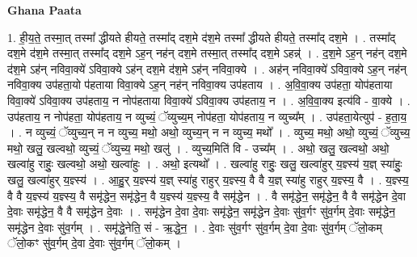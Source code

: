 \documentclass[17pt]{extarticle}
\begin{document}
\textbf{Ghana Paata } \newline

1. ही॒य॒ते॒ तस्मा॒त् तस्मा᳚ द्धीयते हीयते॒ तस्मा᳚द् दश॒मे द॑श॒मे तस्मा᳚ द्धीयते हीयते॒ तस्मा᳚द् दश॒मे । . तस्मा᳚द् दश॒मे द॑श॒मे तस्मा॒त् तस्मा᳚द् दश॒मे ऽह॒न् नह॑न् दश॒मे तस्मा॒त् तस्मा᳚द् दश॒मे ऽहन्न्॑ । . द॒श॒मे ऽह॒न् नह॑न् दश॒मे द॑श॒मे ऽह॑न् नविवा॒क्ये॑ ऽविवा॒क्ये ऽह॑न् दश॒मे द॑श॒मे ऽह॑न् नविवा॒क्ये । . अह॑न् नविवा॒क्ये॑ ऽविवा॒क्ये ऽह॒न् नह॑न् नविवा॒क्य उप॑हता॒यो प॑हताया विवा॒क्ये ऽह॒न् नह॑न् नविवा॒क्य उप॑हताय । . अ॒वि॒वा॒क्य उप॑हता॒ योप॑हताया विवा॒क्ये॑ ऽविवा॒क्य उप॑हताय॒ न नोप॑हताया विवा॒क्ये॑ ऽविवा॒क्य उप॑हताय॒ न । . अ॒वि॒वा॒क्य इत्य॑वि - वा॒क्ये । . उप॑हताय॒ न नोप॑हता॒ योप॑हताय॒ न व्युच्यं॒ ॅव्युच्य॒म् नोप॑हता॒ योप॑हताय॒ न व्युच्य᳚म् । . उप॑हता॒येत्युप॑ - ह॒ता॒य॒ । . न व्युच्यं॒ ॅव्युच्य॒न् न न व्युच्य॒ मथो॒ अथो॒ व्युच्य॒न् न न व्युच्य॒ मथो᳚ । . व्युच्य॒ मथो॒ अथो॒ व्युच्यं॒ ॅव्युच्य॒ मथो॒ खलु॒ खल्वथो॒ व्युच्यं॒ ॅव्युच्य॒ मथो॒ खलु॑ । . व्युच्य॒मिति॑ वि - उच्य᳚म् । . अथो॒ खलु॒ खल्वथो॒ अथो॒ खल्वा॑हु राहुः॒ खल्वथो॒ अथो॒ खल्वा॑हुः । . अथो॒ इत्यथो᳚ । . खल्वा॑हु राहुः॒ खलु॒ खल्वा॑हुर् य॒ज्ञ्स्य॑ य॒ज्ञ् स्या॑हुः॒ खलु॒ खल्वा॑हुर् य॒ज्ञ्स्य॑ । . आ॒हु॒र् य॒ज्ञ्स्य॑ य॒ज्ञ् स्या॑हु राहुर् य॒ज्ञ्स्य॒ वै वै य॒ज्ञ् स्या॑हु राहुर् य॒ज्ञ्स्य॒ वै । . य॒ज्ञ्स्य॒ वै वै य॒ज्ञ्स्य॑ य॒ज्ञ्स्य॒ वै समृ॑द्धेन॒ समृ॑द्धेन॒ वै य॒ज्ञ्स्य॑ य॒ज्ञ्स्य॒ वै समृ॑द्धेन । . वै समृ॑द्धेन॒ समृ॑द्धेन॒ वै वै समृ॑द्धेन दे॒वा दे॒वाः समृ॑द्धेन॒ वै वै समृ॑द्धेन दे॒वाः । . समृ॑द्धेन दे॒वा दे॒वाः समृ॑द्धेन॒ समृ॑द्धेन दे॒वाः सु॑व॒र्गꣳ सु॑व॒र्गम् दे॒वाः समृ॑द्धेन॒ समृ॑द्धेन दे॒वाः सु॑व॒र्गम् । . समृ॑द्धे॒नेति॒ सं - ऋ॒द्धे॒न॒ । . दे॒वाः सु॑व॒र्गꣳ सु॑व॒र्गम् दे॒वा दे॒वाः सु॑व॒र्गम् ॅलो॒कम् ॅलो॒कꣳ सु॑व॒र्गम् दे॒वा दे॒वाः सु॑व॒र्गम् ॅलो॒कम् । \newline
\end{document}
